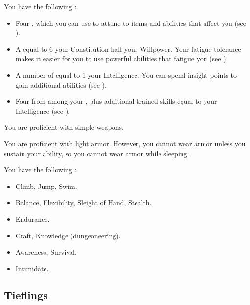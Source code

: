              You have the following :
            \begin{itemize}
                \item Four , which you can use to attune to items and abilities that affect you (see ).
                \item A  equal to 6 \add your Constitution \add half your Willpower.
                    Your fatigue tolerance makes it easier for you to use powerful abilities that fatigue you (see ).
                \item A number of  equal to 1 \add your Intelligence.
                    You can spend insight points to gain additional abilities (see ).
                \item Four  from among your , plus additional trained skills equal to your Intelligence (see ).
            \end{itemize}

            You are proficient with simple weapons.

            You are proficient with light armor.
            However, you cannot wear armor unless you sustain your  ability, so you cannot wear armor while sleeping.

            You have the following :
            \begin{itemize}
                \item {} Climb, Jump, Swim.
                \item {} Balance, Flexibility, Sleight of Hand, Stealth.
                \item {} Endurance.
                \item {} Craft, Knowledge (dungeoneering).
                \item {} Awareness, Survival.
                \item {} Intimidate.
            \end{itemize}

    \subsection{Tieflings}

